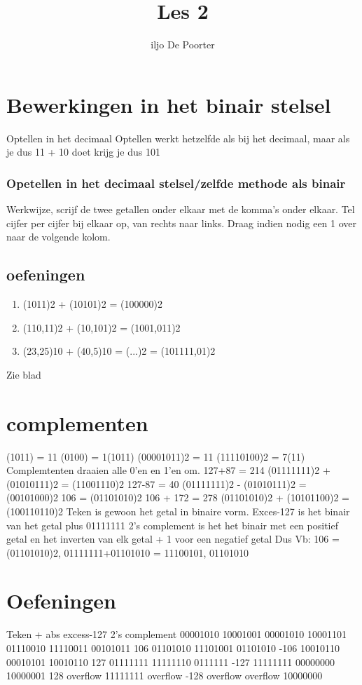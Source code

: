 \documentclass{article}
\author{iljo De Poorter}
\title{Les 2}
\begin{document}
\maketitle
\section{Bewerkingen in het binair stelsel}
Optellen in het decimaal
Optellen werkt hetzelfde als bij het decimaal, maar als je dus 11 + 10 doet krijg je dus 101
\subsubsection{Opetellen in het decimaal stelsel/zelfde methode als binair}
Werkwijze, scrijf de twee getallen onder elkaar met de komma's onder elkaar.
Tel cijfer per cijfer bij elkaar op, van rechts naar links.
Draag indien nodig een 1 over naar de volgende kolom.

\subsection{oefeningen}
\begin{enumerate}
\item (1011)2 + (10101)2 = (100000)2
\item (110,11)2 + (10,101)2 = (1001,011)2
\item (23,25)10 + (40,5)10 = (...)2 = (101111,01)2
\end{enumerate}
Zie blad
\section{complementen}
(1011) = 11
(0100) = 1(1011)
(00001011)2 = 11
(11110100)2 = 7(11)
Complemtenten draaien alle 0'en en 1'en om. 
127+87 = 214
(01111111)2 + (01010111)2 = (11001110)2
127-87 = 40
(01111111)2 - (01010111)2 = (00101000)2
106 = (01101010)2
106 + 172 = 278
(01101010)2 + (10101100)2 = (100110110)2
Teken is gewoon het getal in binaire vorm.
Exces-127 is het binair van het getal plus 01111111
2's complement is het het binair met een positief getal en het inverten van elk getal + 1 voor een negatief getal
Dus Vb: 106 = (01101010)2, 01111111+01101010 = 11100101, 01101010
\section{Oefeningen}
	Teken + abs		excess-127		2's complement
	00001010		10001001		00001010
	10001101		01110010		11110011
	00101011		
106	01101010		11101001	        01101010
-106	10010110		00010101		10010110
127	01111111		11111110		0111111
-127	11111111		00000000		10000001
128	overflow		11111111		overflow
-128	overflow		overflow		10000000
\end{document}
